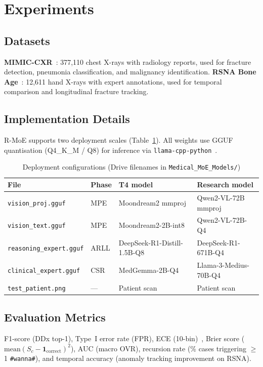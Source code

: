 \documentclass[10pt,twocolumn]{article}
\begin{document}
\section{Experiments}
\label{sec:experiments}

\subsection{Datasets}
\textbf{MIMIC-CXR}~\cite{johnson2019mimic}: 377,110 chest X-rays with radiology reports,
used for fracture detection, pneumonia classification, and malignancy identification.
\textbf{RSNA Bone Age}~\cite{halabi2019rsna}: 12,611 hand X-rays with expert annotations,
used for temporal comparison and longitudinal fracture tracking.

\subsection{Implementation Details}
R-MoE supports two deployment scales (Table~\ref{tab:deploy}).
All weights use GGUF quantisation (Q4\_K\_M / Q8) for inference via
\texttt{llama-cpp-python}~\cite{llama2023cpp}.

\begin{table}[h]
  \centering
  \small
  \caption{Deployment configurations (Drive filenames in \texttt{Medical\_MoE\_Models/})}
  \label{tab:deploy}
  \begin{tabular}{@{}llll@{}}
    \toprule
    \textbf{File} & \textbf{Phase} & \textbf{T4 model} & \textbf{Research model} \\
    \midrule
    \texttt{vision\_proj.gguf}      & MPE  & Moondream2 mmproj    & Qwen2-VL-72B mmproj \\
    \texttt{vision\_text.gguf}      & MPE  & Moondream2-2B-int8   & Qwen2-VL-72B-Q4     \\
    \texttt{reasoning\_expert.gguf} & ARLL & DeepSeek-R1-Distill-1.5B-Q8 & DeepSeek-R1-671B-Q4 \\
    \texttt{clinical\_expert.gguf}  & CSR  & MedGemma-2B-Q4       & Llama-3-Medius-70B-Q4 \\
    \texttt{test\_patient.png}      & —    & Patient scan         & Patient scan \\
    \bottomrule
  \end{tabular}
\end{table}

\subsection{Evaluation Metrics}
F1-score (DDx top-1), Type~I error rate (FPR), ECE (10-bin)~\cite{guo2017calibration},
Brier score ($\text{mean}(S_c - \mathbf{1}_{\text{correct}})^2$), AUC (macro OVR),
recursion rate (\% cases triggering $\ge$1 \texttt{\#wanna\#}), and temporal
accuracy (anomaly tracking improvement on RSNA).
\end{document}
